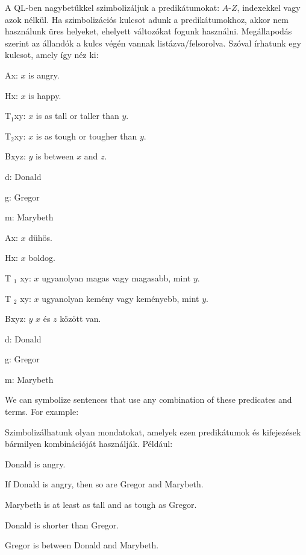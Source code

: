 A QL-ben nagybetűkkel szimbolizáljuk a predikátumokat: $A$-$Z$, indexekkel vagy azok nélkül. Ha szimbolizációs kulcsot adunk a predikátumokhoz, akkor nem használunk üres helyeket, ehelyett változókat fogunk használni. Megállapodás szerint az állandók a kulcs végén vannak listázva/felsorolva. Szóval írhatunk egy kulcsot, amely így néz ki:

\begin{ekey}
\item[Ax:] $x$ is angry.
\item[Hx:] $x$ is happy.
\item[T$_1$xy:] $x$ is as tall or taller than $y$.
\item[T$_2$xy:] $x$ is as tough or tougher than $y$.
\item[Bxyz:] $y$ is between $x$ and $z$.
\item[d:] Donald
\item[g:] Gregor
\item[m:] Marybeth
\end {ekey}

\begin{ekey}
\item [Ax:] $ x $ dühös.
\item [Hx:] $ x $ boldog.
\item [T $ _1 $ xy:] $ x $ ugyanolyan magas vagy magasabb, mint $ y $.
\item [T $ _2 $ xy:] $ x $ ugyanolyan kemény vagy keményebb, mint $ y $.
\item [Bxyz:] $ y $ $ x $ és $ z $ között van.
\item [d:] Donald
\item [g:] Gregor
\item [m:] Marybeth
\end{ekey}

We can symbolize sentences that use any combination of these predicates and terms. For example:

Szimbolizálhatunk olyan mondatokat, amelyek ezen predikátumok és kifejezések bármilyen kombinációját használják. Például:

\begin {earg}
\item[\ex{terms1}] Donald is angry.
\item[\ex{terms2}] If Donald is angry, then so are Gregor and Marybeth.
\item[\ex{terms3}] Marybeth is at least as tall and as tough as Gregor.
\item[\ex{terms4}] Donald is shorter than Gregor.
\item[\ex{terms5}] Gregor is between Donald and Marybeth.
\end {earg}

